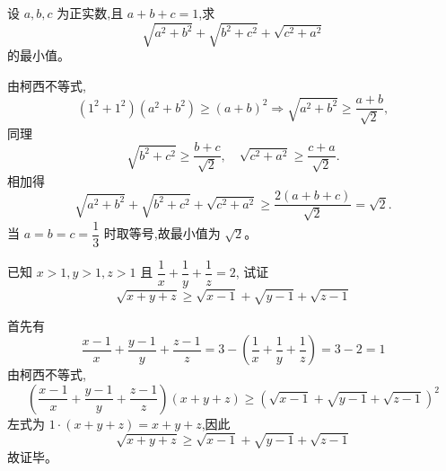 \begin{questions}
    \question 设 $a,b,c$ 为正实数,且 $a+b+c=1$,求
    \[
    \sqrt{a^2+b^2}+\sqrt{b^2+c^2}+\sqrt{c^2+a^2}
    \]
    的最小值。
    \begin{solution}
        由柯西不等式,
        \[
        (1^2+1^2)(a^2+b^2)\ge (a+b)^2 \Rightarrow \sqrt{a^2+b^2}\ge \frac{a+b}{\sqrt{2}},
        \]
        同理
        \[
        \sqrt{b^2+c^2}\ge \frac{b+c}{\sqrt{2}},\quad \sqrt{c^2+a^2}\ge \frac{c+a}{\sqrt{2}}.
        \]
        相加得
        \[
        \sqrt{a^2+b^2}+\sqrt{b^2+c^2}+\sqrt{c^2+a^2}
        \ge \frac{2(a+b+c)}{\sqrt{2}}=\sqrt{2}.
        \]
        当 $a=b=c=\dfrac13$ 时取等号,故最小值为 $\sqrt{2}$。
    \end{solution}

    \question 已知 $x>1,y>1,z>1$ 且 $\dfrac{1}{x}+\dfrac{1}{y}+\dfrac{1}{z}=2$, 试证
    \[
    \sqrt{x+y+z}\ge \sqrt{x-1}+\sqrt{y-1}+\sqrt{z-1}
    \]
    \begin{solution}
        首先有
        \[
        \frac{x-1}{x}+\frac{y-1}{y}+\frac{z-1}{z}
        =3-\left(\frac{1}{x}+\frac{1}{y}+\frac{1}{z}\right)=3-2=1
        \]
        由柯西不等式,
        \[
        \left(\frac{x-1}{x}+\frac{y-1}{y}+\frac{z-1}{z}\right)(x+y+z)
        \ge\left(\sqrt{x-1}+\sqrt{y-1}+\sqrt{z-1}\right)^2
        \]
        左式为 $1\cdot(x+y+z)=x+y+z$,因此
        \[
        \sqrt{x+y+z}\ge \sqrt{x-1}+\sqrt{y-1}+\sqrt{z-1}
        \]
        故证毕。
    \end{solution}

    \question 
\end{questions}
